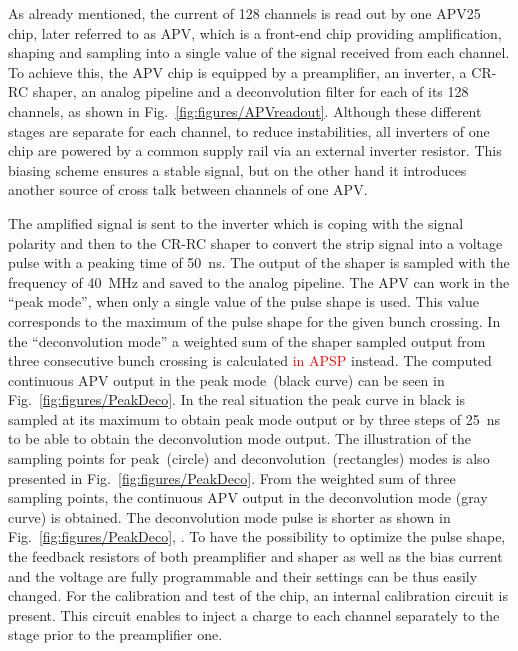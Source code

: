 As already mentioned, the current of 128 channels is read out by one APV25~\cite{French:2001xb} chip, later referred to as APV, which is a front-end chip providing amplification, shaping and sampling into a single value of the signal received from each channel. To achieve this, the APV chip is equipped by a preamplifier, an inverter, a CR-RC shaper, an analog pipeline and a deconvolution filter for each of its 128 channels, as shown in Fig.~\ref{fig:figures/APVreadout}. Although these different stages are separate for each channel, to reduce instabilities, all inverters of one chip are powered by a common supply rail via an external inverter resistor. This biasing scheme ensures a stable signal, but on the other hand it introduces another source of cross talk between channels of one APV.

The amplified signal is sent to the inverter which is coping with the signal polarity and then to the CR-RC shaper to convert the strip signal into a voltage pulse with a peaking time of 50~ns. The output of the shaper is sampled with the frequency of 40~MHz and saved to the analog pipeline. The APV can work in the ``peak mode'', when only a single value of the pulse shape is used. This value corresponds to the maximum of the pulse shape for the given bunch crossing. In the ``deconvolution mode'' a weighted sum of the shaper sampled output from three consecutive bunch crossing is calculated \textcolor{red}{in APSP} instead. The computed continuous APV output in the peak mode~(black curve) can be seen in Fig.~\ref{fig:figures/PeakDeco}. In the real situation the peak curve in black is sampled at its maximum to obtain peak mode output or by three steps of 25~ns to be able to obtain the deconvolution mode output. The illustration of the sampling points for peak~(circle) and deconvolution~(rectangles) modes is also presented in Fig.~\ref{fig:figures/PeakDeco}. From the weighted sum of three sampling points, the continuous APV output in the deconvolution mode (gray curve) is obtained. The deconvolution mode pulse is shorter as shown in Fig.~\ref{fig:figures/PeakDeco}, . To have the possibility to optimize the pulse shape, the feedback resistors of both preamplifier and shaper as well as the bias current and the voltage are fully programmable and their settings can be thus easily changed. For the calibration and test of the chip, an internal calibration circuit is present. This circuit enables to inject a charge to each channel separately to the stage prior to the preamplifier one.


